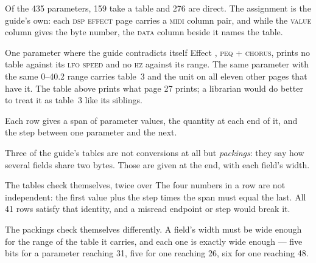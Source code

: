 Of the 435 parameters, 159 take a table and 276 are direct. The assignment is the guide's
own: each \textsc{dsp effect} page carries a \textsc{midi} column pair, and while the
\textsc{value} column gives the byte number, the \textsc{data} column beside it names the
table.

\begin{note}{One parameter where the guide contradicts itself}
Effect , \textsc{peq + chorus}, prints no table against its \textsc{lfo speed}
and no \textsc{hz} against its range. The same parameter with the same 0--40.2 range
carries table~3 and the unit on all eleven other pages that have it. The table above prints
what page 27 prints; a librarian would do better to treat it as table~3 like its
siblings.
\end{note}

Each row gives a span of parameter values, the quantity at each end of it, and the step
between one parameter and the next.

Three of the guide's tables are not conversions at all but \emph{packings}: they say how
several fields share two bytes. Those are given at the end, with each field's width.

\begin{note}{The tables check themselves, twice over}
The four numbers in a row are not independent: the first value plus the step times the
span must equal the last. All 41 rows satisfy that identity, and a misread endpoint or
step would break it.

The packings check themselves differently. A field's width must be wide enough for the
range of the table it carries, and each one is exactly wide enough --- five bits for a
parameter reaching 31, five for one reaching 26, six for one reaching 48.
\end{note}



